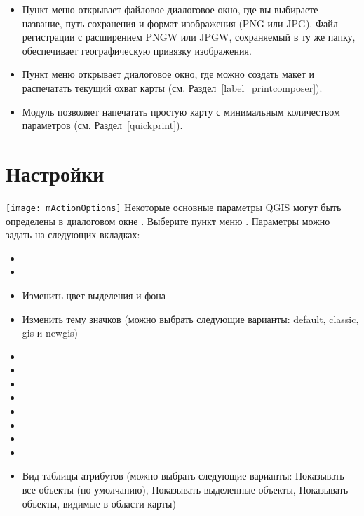 \begin{itemize}
\item Пункт меню 
открывает файловое диалоговое окно, где вы выбираете название, путь сохранения
и формат изображения (PNG или JPG). Файл регистрации с расширением PNGW
или JPGW, сохраняемый в ту же папку, обеспечивает географическую привязку
изображения.
\item Пункт меню 
открывает диалоговое окно, где можно создать макет и распечатать текущий
охват карты (см. Раздел~\ref{label_printcomposer}).
\item Модуль  позволяет напечатать
простую карту с минимальным количеством параметров (см. Раздел~\ref{quickprint}).
\end{itemize}

\section{Настройки}\label{subsec:gui_options}

\texttt{[image: mActionOptions]} Некоторые основные
параметры QGIS могут быть определены в диалоговом окне .
Выберите пункт меню  \arrow
{}. Параметры можно задать на
следующих вкладках:


\begin{itemize}
\item {}
\item {}
\item Изменить цвет выделения и фона
\item Изменить тему значков (можно выбрать следующие варианты: default,
classic, gis и newgis)
\item {}
\item {}
\item {}
\item {}
\item {}
\item {}
\item {}
\item {}
\item Вид таблицы атрибутов (можно выбрать следующие варианты: Показывать
все объекты (по умолчанию), Показывать выделенные объекты, Показывать
объекты, видимые в области карты)
\end{itemize}

